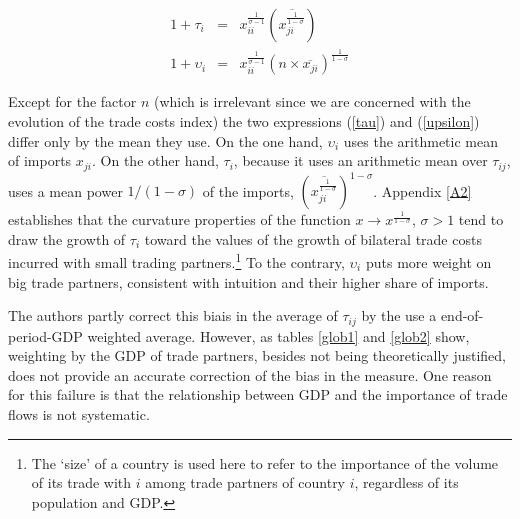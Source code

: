 \documentclass{article}
\begin{document}
\begin{eqnarray}
1+\tau_i&=& x_{ii}^{\frac{1}{\sigma-1}} \left(\overline{{x_{ji}^{\frac{1}{1-\sigma}}}}\right) \label{tau}\\
1+\upsilon_i&=&x_{ii}^{\frac{1}{\sigma-1}} (n \times \overline{x_{ji}})^{\frac{1}{1-\sigma}}\label{upsilon}
\end{eqnarray}

Except for the factor $n$ (which is irrelevant since we are
concerned with the evolution of the trade costs index) the two
expressions (\ref{tau}) and (\ref{upsilon}) differ only by the
mean they use. On the one hand, $\upsilon_i$ uses the
arithmetic mean of imports $x_{ji}$. On the other hand,
$\tau_i$, because it uses an arithmetic mean over $\tau_{ij}$,
uses a mean power $1/(1-\sigma)$ of the imports,
$\left(\overline{x_{ji}^{\frac{1}{1-\sigma}}}\right)^{1-\sigma}$.
Appendix \ref{A2} establishes that the curvature
properties of the function $x \rightarrow
x^{\frac{1}{1-\sigma}}$, $\sigma>1$ tend to draw the growth of
$\tau_i$ toward the values of the growth of bilateral trade
costs incurred with small trading partners.\footnote{The `size' of a country is
used here to refer to the importance of the volume of its trade
with $i$ among trade partners of country $i$, regardless of its
population and GDP.} To the contrary,
$\upsilon_i$ puts more weight on big trade partners, consistent
with intuition and their higher share of imports.

The authors partly correct this biais in the average of $\tau_{ij}$ by the use a end-of-period-GDP
weighted average. However, as tables \ref{glob1} and \ref{glob2} show,
weighting by the GDP of trade partners, besides not being
theoretically justified, does not provide an accurate
correction of the bias in the measure. One reason for this
failure is that the relationship between GDP and the importance
of trade flows is not systematic.\\
\end{document}
